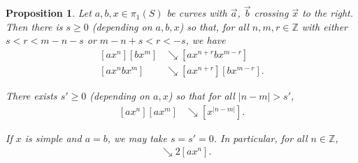 \documentclass[10pt,a4paper]{amsart}
\newtheorem{proposition}{Proposition}
\newcommand\bbZ{\ensuremath{\mathbb{Z}}}
\newcommand{\ora}[1]{\overrightarrow{#1}}
\newcommand{\reducesto}{\mathrel{\searrow}}
\begin{document}
\begin{proposition}\label{prop:join-split-geom}
Let $a,b,x \in \pi_1(S)$ be curves with $\ora{a}$, $\ora{b}$
crossing $\ora{x}$ to the right. Then there is $s \ge 0$ (depending on $a,b,x$)
  so that, for all
 $n, m, r \in \mathbb{Z}$ with either $s < r < m-n-s$ or $m-n+s < r <
 -s$, we have
  \begin{align}
    \label{eq:cross-join} [a x^n] [b x^m] &\reducesto [ax^{n+r}bx^{m-r}]\\
    \label{eq:cross-split} [a x^nb x^m] &\reducesto [ax^{n+r}][bx^{m-r}].
  \end{align}

  There exists $s' \ge 0$ (depending on $a,x$) so that for all
  $|n-m| > s'$,
  \begin{align}
    \label{eq:cross-cancel}[ax^n][ax^m] &\reducesto [x^{|n-m|}].
  \end{align}

 If $x$ is simple and $a=b$, we may take $s=s'=0$. In particular, for
 all $n\in\bbZ$,
 \begin{align}
    [a x^{n+1}] [a x^{n-1}] &\reducesto 2[ax^{n}].\label{eq:cross-simple}
  \end{align}
\end{proposition}
\end{document}
